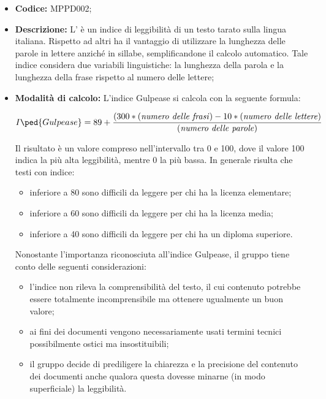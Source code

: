 \documentclass[../NormediProgetto.tex]{subfiles}
\begin{document}
\begin{itemize}
	\item \textbf{Codice:} MPPD002;
	
	\item \textbf{Descrizione:} L’ è un indice di leggibilità di un testo tarato sulla lingua italiana. Rispetto ad altri ha il vantaggio di utilizzare la lunghezza delle parole in lettere anziché in sillabe, semplificandone il calcolo automatico. Tale indice considera due variabili linguistiche: la lunghezza della parola e la lunghezza della frase rispetto al numero delle lettere;
	
	\item \textbf{Modalità di calcolo:} L'indice Gulpease si calcola con la seguente formula:
	
	\[ I\ped{Gulpease} = 89 +  \frac{(300*(\textrm{\textit{numero delle frasi}})-10*(\textrm{\textit{numero delle lettere}})}{(\textrm{\textit{numero delle parole}})} \]
	
	Il risultato è un valore compreso nell’intervallo tra 0 e 100, dove il valore 100 indica la
	più alta leggibilità, mentre 0 la più bassa. In generale risulta che testi con indice:
	\begin{itemize}
		\item inferiore a 80 sono difficili da leggere per chi ha la licenza elementare; 
		\item inferiore a 60 sono difficili da leggere per chi ha la licenza media;
		\item inferiore a 40 sono difficili da leggere per chi ha un diploma superiore.
	\end{itemize}
	
	Nonostante l'importanza riconosciuta all'indice Gulpease, il gruppo tiene conto delle seguenti considerazioni:
	\begin{itemize}
		\item l'indice non rileva la comprensibilità del testo, il cui contenuto potrebbe essere totalmente incomprensibile ma ottenere ugualmente un buon valore; 
		\item ai fini dei documenti vengono necessariamente usati termini tecnici possibilmente ostici ma insostituibili;
		\item il gruppo decide di prediligere la chiarezza e la precisione del contenuto dei documenti anche qualora questa dovesse minarne (in modo superficiale) la leggibilità.
	\end{itemize}
\end{itemize}
\end{document}
